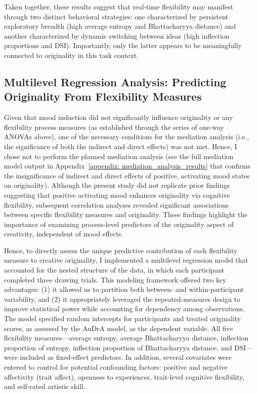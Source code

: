 \documentclass[../MA_Thesis.tex]{subfiles}
\begin{document}
Taken together, these results suggest that real-time flexibility may manifest through two distinct behavioral strategies: one characterized by persistent exploratory breadth (high average entropy and Bhattacharyya distance) and another characterized by dynamic switching between ideas (high inflection proportions and DSI). Importantly, only the latter appears to be meaningfully connected to originality in this task context.

\subsection*{Multilevel Regression Analysis: Predicting Originality From Flexibility Measures}
Given that mood induction did not significantly influence originality or any flexibility process measures (as established through the series of one-way ANOVAs above), one of the necessary conditions for the mediation analysis (i.e., the significance of both the indirect and direct effects) was not met. Hence, I chose not to perform the planned mediation analysis (see the full mediation model output in Appendix~\ref{appendix: mediation_analysis_results} that confirms the insignificance of indirect and direct effects of positive, activating mood states on originality). Although the present study did not replicate prior findings suggesting that positive activating mood enhances originality via cognitive flexibility, subsequent correlation analyses revealed significant associations between specific flexibility measures and originality. These findings highlight the importance of examining process-level predictors of the originality aspect of creativity, independent of mood effects.

Hence, to directly assess the unique predictive contribution of each flexibility measure to creative originality, I implemented a multilevel regression model that accounted for the nested structure of the data, in which each participant completed three drawing trials. This modeling framework offered two key advantages: (1) it allowed us to partition both between- and within-participant variability, and (2) it appropriately leveraged the repeated-measures design to improve statistical power while accounting for dependency among observations. The model specified random intercepts for participants and treated originality scores, as assessed by the AuDrA model, as the dependent variable. All five flexibility measures—average entropy, average Bhattacharyya distance, inflection proportion of entropy, inflection proportion of Bhattacharyya distance, and DSI—were included as fixed-effect predictors. In addition, several covariates were entered to control for potential confounding factors: positive and negative affectivity (trait affect), openness to experiences, trait-level cognitive flexibility, and self-rated artistic skill.
\end{document}
